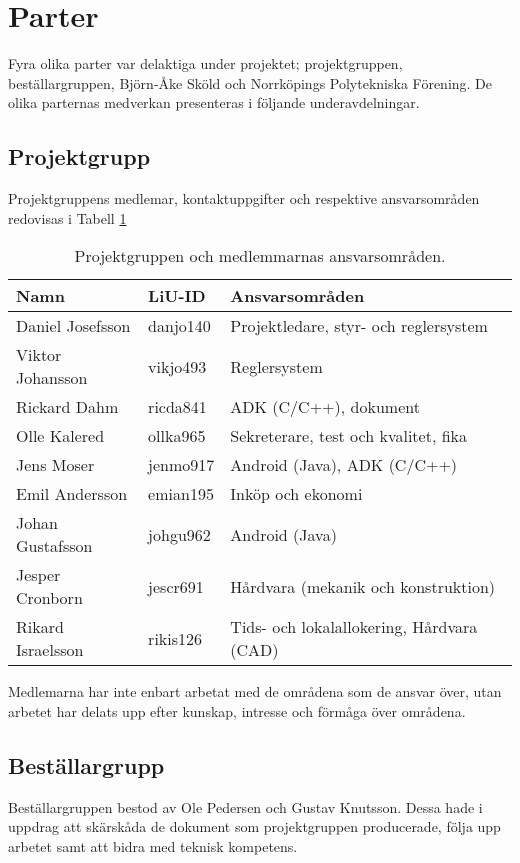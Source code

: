 \section{Parter}
Fyra olika parter var delaktiga under projektet; projektgruppen,
beställargruppen, Björn-Åke Sköld och Norrköpings Polytekniska Förening. De
olika parternas medverkan presenteras i följande underavdelningar.

\subsection{Projektgrupp}
Projektgruppens medlemar, kontaktuppgifter och respektive ansvarsområden
redovisas i Tabell \ref{tbl:projektgruppen}

\begin{table}[htbp!]
\label{tbl:projektgruppen}
\caption{Projektgruppen och medlemmarnas ansvarsområden.}
\centering
\begin{tabular}{|l|l|p{}|}
\hline
Namn & LiU-ID & Ansvarsområden \\
\hline
\hline
Daniel Josefsson & danjo140 & Projektledare, styr- och reglersystem \\
Viktor Johansson & vikjo493 & Reglersystem \\
Rickard Dahm & ricda841 & ADK (C/C++), dokument \\
Olle Kalered & ollka965 & Sekreterare, test och kvalitet, fika \\
Jens Moser & jenmo917 & Android (Java), ADK (C/C++) \\
Emil Andersson & emian195 & Inköp och ekonomi \\
Johan Gustafsson & johgu962 & Android (Java) \\
Jesper Cronborn & jescr691 & Hårdvara (mekanik och konstruktion)\\
Rikard Israelsson & rikis126 & Tids- och lokalallokering, \newline 
Hårdvara (CAD) \\
\hline
\end{tabular}
\end{table}

Medlemarna har inte enbart arbetat med de områdena som de ansvar över, utan
arbetet har delats upp efter kunskap, intresse och förmåga över områdena.

\subsection{Beställargrupp}
Beställargruppen bestod av Ole Pedersen och Gustav Knutsson. Dessa hade i
uppdrag att skärskåda de dokument som projektgruppen producerade, följa upp
arbetet samt att bidra med teknisk kompetens.

